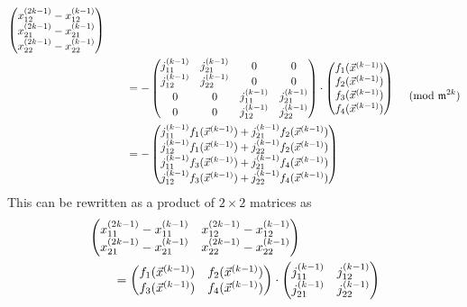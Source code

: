 {\[\begin{aligned}
\begin{pmatrix}
  x_{12}^{(2k-1)} - x_{12}^{(k-1)} \\
  x_{21}^{(2k-1)} - x_{21}^{(k-1)} \\
  x_{22}^{(2k-1)} - x_{22}^{(k-1)} \end{pmatrix} \\
\null & \qquad =
- \begin{pmatrix}
   j_{11}^{(k-1)} & j_{21}^{(k-1)} & 0 & 0 \\
   j_{12}^{(k-1)} & j_{22}^{(k-1)} & 0 & 0 \\
   0 & 0 & j_{11}^{(k-1)} & j_{21}^{(k-1)} \\
   0 & 0 & j_{12}^{(k-1)} & j_{22}^{(k-1)} \end{pmatrix}
\cdot
\begin{pmatrix}
  f_1(\vec{x}^{(k-1)}) \\ 
  f_2(\vec{x}^{(k-1)}) \\
  f_3(\vec{x}^{(k-1)}) \\ 
  f_4(\vec{x}^{(k-1)}) \end{pmatrix} \\
\null & \qquad = - \begin{pmatrix}
    j_{11}^{(k-1)}f_1(\vec{x}^{(k-1)}) + j_{21}^{(k-1)}f_2(\vec{x}^{(k-1)})\\
    j_{12}^{(k-1)}f_1(\vec{x}^{(k-1)}) + j_{22}^{(k-1)}f_2(\vec{x}^{(k-1)})\\
    j_{11}^{(k-1)}f_3(\vec{x}^{(k-1)}) + j_{21}^{(k-1)}f_4(\vec{x}^{(k-1)})\\
    j_{12}^{(k-1)}f_3(\vec{x}^{(k-1)}) + j_{22}^{(k-1)}f_4(\vec{x}^{(k-1)})
    \end{pmatrix}
\\
\end{aligned}
\pmod{\mathfrak{m}^{2k}}
\]
This can be rewritten as a product of $2 \times 2$ matrices as 
\[
\begin{aligned}
\null & \begin{pmatrix}
  x_{11}^{(2k-1)} - x_{11}^{(k-1)} &
  x_{12}^{(2k-1)} - x_{12}^{(k-1)} \\
  x_{21}^{(2k-1)} - x_{21}^{(k-1)} &
  x_{22}^{(2k-1)} - x_{22}^{(k-1)} \end{pmatrix} \\
\null & \qquad =
\begin{pmatrix}
  f_1(\vec{x}^{(k-1)}) & f_2(\vec{x}^{(k-1)}) \\
  f_3(\vec{x}^{(k-1)}) & f_4(\vec{x}^{(k-1)}) \end{pmatrix}
\cdot
\begin{pmatrix}
   j_{11}^{(k-1)} & j_{12}^{(k-1)} \\
   j_{21}^{(k-1)} & j_{22}^{(k-1)} \end{pmatrix}
\end{aligned}
\]


}
